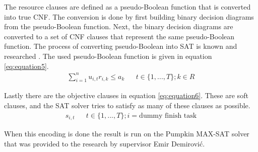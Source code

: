 The resource clauses are defined as a pseudo-Boolean function that is converted into true CNF. The conversion is done by first building binary decision diagrams from the pseudo-Boolean function. Next, the binary decision diagrams are converted to a set of CNF clauses that represent the same pseudo-Boolean function. The process of converting pseudo-Boolean into SAT is known and researched \cite{RN38}. The used pseudo-Boolean function is given in equation \ref{eq:equation5}.
\begin{align}\label{eq:equation5}
\sum^n_{i=1} u_{i,t}r_{i,k} \leq a_k    &&  t\in \{1,...,T\}; k\in R
\end{align}

Lastly there are the objective clauses in equation \ref{eq:equation6}. These are soft clauses, and the SAT solver tries to satisfy as many of these clauses as possible.
\begin{align}\label{eq:equation6}
s_{i,t} &&  t\in \{1,...,T\}; i = \text{dummy finish task}
\end{align}

When this encoding is done the result is run on the Pumpkin MAX-SAT solver that was provided to the research by supervisor Emir Demirović.

